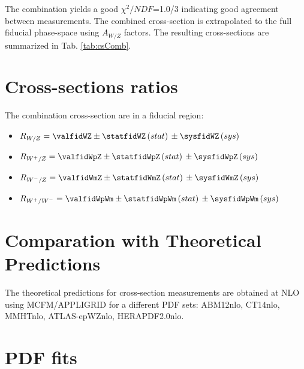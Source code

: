 The combination yields a good $\chi^2/NDF$=1.0/3 indicating good agreement between measurements. The combined cross-section is extrapolated to the full fiducial phase-space using $A_{W/Z}$ factors. The resulting cross-sections are summarized in Tab. \ref{tab:csComb}.


\section{Cross-sections ratios}
The combination cross-section are in a fiducial region:
\begin{itemize}
\item $R_{W/Z} = \valfidWZ \pm \statfidWZ \, (stat)\, \pm \sysfidWZ\, (sys)\,  $
\item $R_{W^{+}/Z} = \valfidWpZ \pm \statfidWpZ\, (stat)\, \pm \sysfidWpZ \, (sys)\, $
\item $R_{W^{-}/Z} = \valfidWmZ \pm \statfidWmZ\, (stat)\,  \pm \sysfidWmZ\,  (sys)\, $
\item $R_{W^{+}/W^{-}} = \valfidWpWm \pm \statfidWpWm\, (stat)\, \pm \sysfidWpWm\,  (sys)\,  $
\end{itemize}


\section{Comparation with Theoretical Predictions}
The theoretical predictions for cross-section measurements are obtained at NLO using MCFM/APPLIGRID for a different PDF sets: ABM12nlo, CT14nlo, MMHTnlo, ATLAS-epWZnlo, HERAPDF2.0nlo. 
\section{PDF fits}